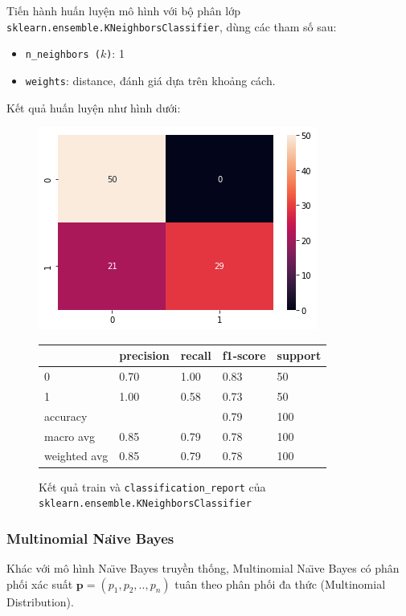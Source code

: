 \documentclass[12pt]{article}
\begin{document}
Tiến hành huấn luyện mô hình với bộ phân lớp \texttt{sklearn.ensemble.KNeighborsClassifier}, dùng các tham số sau:
\begin{itemize}
\item \texttt{n\_neighbors ($k$)}: 1
\item \texttt{weights}: distance, đánh giá dựa trên khoảng cách.
\end{itemize}
Kết quả huấn luyện như hình dưới:
\begin{figure}[H]
	\begin{multicols}{2}
		\includegraphics[scale=.5]{img/train-knn-result.png}

		\begin{table}[H]
			\begin{tabular}{l l l l l}
				\hline
				& precision & recall & f1-score & support \\
				\hline
				0 & 0.70 & 1.00 & 0.83 & 50 \\
				1 & 1.00 & 0.58 & 0.73 & 50 \\
				accuracy &   &   & 0.79 & 100 \\
				macro avg & 0.85 & 0.79 & 0.78 & 100 \\
				weighted avg & 0.85 & 0.79 & 0.78 & 100 \\
				\hline
			\end{tabular}
		\end{table}
	\end{multicols}
	\caption{Kết quả train và \texttt{classification\_report} của \texttt{sklearn.ensemble.KNeighborsClassifier}}
\end{figure}

\subsubsection{Multinomial Na\"{\i}ve Bayes}
Khác với mô hình Na\"{\i}ve Bayes truyền thống, Multinomial Na\"{\i}ve Bayes có phân phối xác suất $\mathbf{p} = (p_1, p_2, .., p_n)$ tuân theo phân phối đa thức (Multinomial Distribution).
\end{document}
